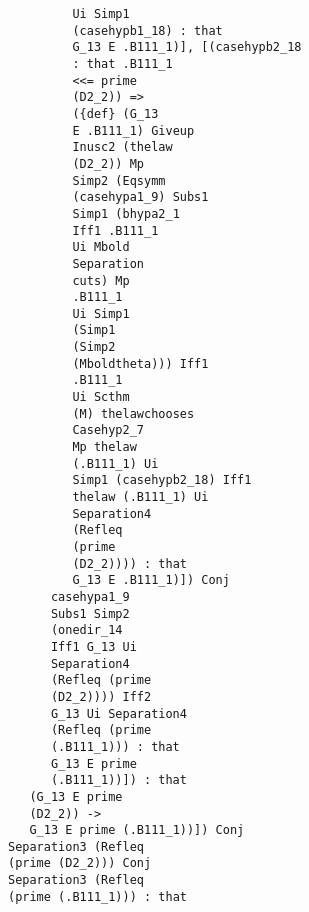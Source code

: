 \documentclass[12pt]{article}
\begin{document}
\begin{verbatim}
                                  Ui Simp1 
                                  (casehypb1_18) : that 
                                  G_13 E .B111_1)], [(casehypb2_18 
                                  : that .B111_1 
                                  <<= prime 
                                  (D2_2)) => 
                                  ({def} (G_13 
                                  E .B111_1) Giveup 
                                  Inusc2 (thelaw 
                                  (D2_2)) Mp 
                                  Simp2 (Eqsymm 
                                  (casehypa1_9) Subs1 
                                  Simp1 (bhypa2_1 
                                  Iff1 .B111_1 
                                  Ui Mbold 
                                  Separation 
                                  cuts) Mp 
                                  .B111_1 
                                  Ui Simp1 
                                  (Simp1 
                                  (Simp2 
                                  (Mboldtheta))) Iff1 
                                  .B111_1 
                                  Ui Scthm 
                                  (M) thelawchooses 
                                  Casehyp2_7 
                                  Mp thelaw 
                                  (.B111_1) Ui 
                                  Simp1 (casehypb2_18) Iff1 
                                  thelaw (.B111_1) Ui 
                                  Separation4 
                                  (Refleq 
                                  (prime 
                                  (D2_2)))) : that 
                                  G_13 E .B111_1)]) Conj 
                               casehypa1_9 
                               Subs1 Simp2 
                               (onedir_14 
                               Iff1 G_13 Ui 
                               Separation4 
                               (Refleq (prime 
                               (D2_2)))) Iff2 
                               G_13 Ui Separation4 
                               (Refleq (prime 
                               (.B111_1))) : that 
                               G_13 E prime 
                               (.B111_1))]) : that 
                            (G_13 E prime 
                            (D2_2)) -> 
                            G_13 E prime (.B111_1))]) Conj 
                         Separation3 (Refleq 
                         (prime (D2_2))) Conj 
                         Separation3 (Refleq 
                         (prime (.B111_1))) : that 

\end{verbatim}
\end{document}
